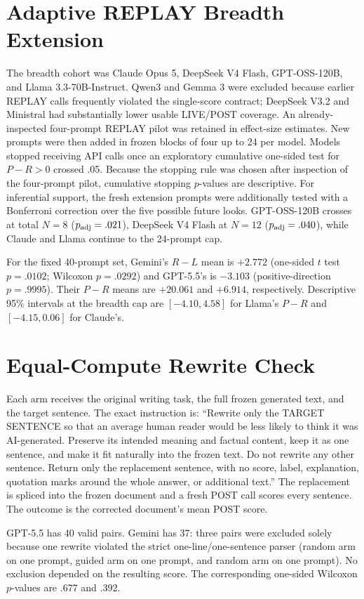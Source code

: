 \section{Adaptive REPLAY Breadth Extension}
\label{app:adaptive}
The breadth cohort was Claude Opus 5, DeepSeek V4 Flash, GPT-OSS-120B, and Llama 3.3-70B-Instruct. Qwen3 and Gemma 3 were excluded because earlier REPLAY calls frequently violated the single-score contract; DeepSeek V3.2 and Ministral had substantially lower usable LIVE/POST coverage. An already-inspected four-prompt REPLAY pilot was retained in effect-size estimates. New prompts were then added in frozen blocks of four up to 24 per model. Models stopped receiving API calls once an exploratory cumulative one-sided test for $P-R>0$ crossed .05. Because the stopping rule was chosen after inspection of the four-prompt pilot, cumulative stopping $p$-values are descriptive. For inferential support, the fresh extension prompts were additionally tested with a Bonferroni correction over the five possible future looks. GPT-OSS-120B crosses at total $N=8$ ($p_{\rm adj}=.021$), DeepSeek V4 Flash at $N=12$ ($p_{\rm adj}=.040$), while Claude and Llama continue to the 24-prompt cap.

For the fixed 40-prompt set, Gemini's $R-L$ mean is $+2.772$ (one-sided $t$ test $p=.0102$; Wilcoxon $p=.0292$) and GPT-5.5's is $-3.103$ (positive-direction $p=.9995$). Their $P-R$ means are $+20.061$ and $+6.914$, respectively. Descriptive 95\% intervals at the breadth cap are $[-4.10,4.58]$ for Llama's $P-R$ and $[-4.15,0.06]$ for Claude's.

\section{Equal-Compute Rewrite Check}
\label{app:rewrite}
Each arm receives the original writing task, the full frozen generated text, and the target sentence. The exact instruction is: ``Rewrite only the TARGET SENTENCE so that an average human reader would be less likely to think it was AI-generated. Preserve its intended meaning and factual content, keep it as one sentence, and make it fit naturally into the frozen text. Do not rewrite any other sentence. Return only the replacement sentence, with no score, label, explanation, quotation marks around the whole answer, or additional text.'' The replacement is spliced into the frozen document and a fresh POST call scores every sentence. The outcome is the corrected document's mean POST score.

GPT-5.5 has 40 valid pairs. Gemini has 37: three pairs were excluded solely because one rewrite violated the strict one-line/one-sentence parser (random arm on one prompt, guided arm on one prompt, and random arm on one prompt). No exclusion depended on the resulting score. The corresponding one-sided Wilcoxon $p$-values are .677 and .392.

